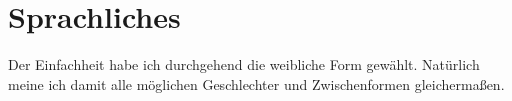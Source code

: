 \chapter{Sprachliches}

Der Einfachheit habe ich durchgehend die weibliche Form gewählt. Natürlich meine ich damit alle möglichen Geschlechter und Zwischenformen gleichermaßen.
